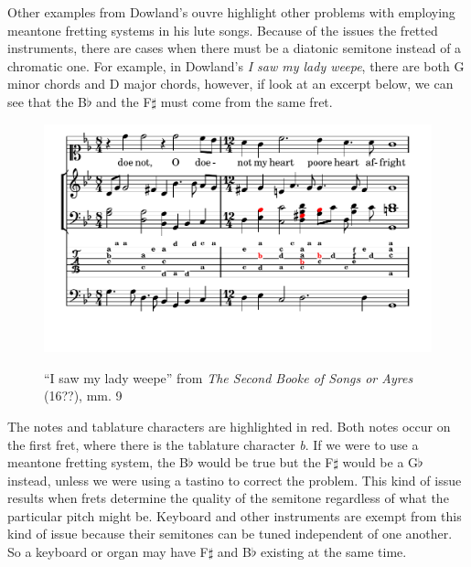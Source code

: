 Other examples from Dowland's ouvre highlight other problems with employing meantone
fretting systems in his lute songs.  Because of the issues the fretted instruments,
there are cases when there must be a diatonic semitone instead of a chromatic one. For
example, in Dowland's \textit{I saw my lady weepe}, there are both G minor chords and
D major chords, however, if look at an excerpt below, we can see that the B$\flat$ and
the F$\sharp$ must come from the same fret.
\begin{figure}[h]
\centering
\includegraphics{examples/saw.pdf}
\label{dowland-saw}
\caption{``I saw my lady weepe'' from \textit{The Second Booke of Songs or Ayres} (16??), mm. 9}
\end{figure}
The notes and tablature characters are highlighted in red.  Both notes occur on the
first fret, where there is the tablature character \textit{b}.  If we were to use a
meantone fretting system, the B$\flat$ would be true but the F$\sharp$ would be
a G$\flat$ instead, unless we were using a tastino to correct the problem.
This kind of issue results when frets determine the quality of the semitone
regardless of what the particular pitch might be.  Keyboard and other instruments are
exempt from this kind of issue because their semitones can be tuned independent of one
another.  So a keyboard or organ may have F$\sharp$ and B$\flat$ existing at the same
time.

